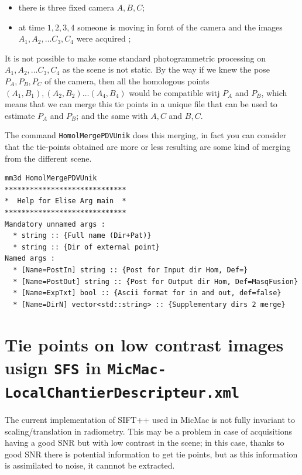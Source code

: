 \begin{itemize}
    \item there is three fixed camera $A,B,C$;
    \item at time $1,2,3,4$ someone is moving in fornt of the camera and the images $A_1,A_2, \dots C_3,C_4$ were acquired ;
\end{itemize}

It is not possible to make some standard photogrammetric processing on $A_1,A_2, \dots C_3,C_4$ as the scene is not static.
By the way if we knew the pose  $P_A,P_B,P_C$ of the camera, then  all the homologous points $(A_1,B_1), (A_2,B_2) \dots (A_4,B_4)$ 
would be compatible witj $P_A$ and $P_B$, which means that we can merge this tie points in a unique file that can be used
to estimate $P_A$ and $P_B$; and the same with $A,C$ and $B,C$. 


The command  {\tt HomolMergePDVUnik} does this merging, in fact you can consider that the tie-points 
obtained are more or less resulting are some kind of merging from the different scene. 

\begin{verbatim}
mm3d HomolMergePDVUnik
*****************************
*  Help for Elise Arg main  *
*****************************
Mandatory unnamed args : 
  * string :: {Full name (Dir+Pat)}
  * string :: {Dir of external point}
Named args : 
  * [Name=PostIn] string :: {Post for Input dir Hom, Def=}
  * [Name=PostOut] string :: {Post for Output dir Hom, Def=MasqFusion}
  * [Name=ExpTxt] bool :: {Ascii format for in and out, def=false}
  * [Name=DirN] vector<std::string> :: {Supplementary dirs 2 merge}
\end{verbatim}



\section{Tie points on low contrast images usign {\tt SFS} in {\tt MicMac-LocalChantierDescripteur.xml}}


The current implementation of SIFT++ used in MicMac is not fully invariant to scaling/translation in radiometry. This may be a problem in case of acquisitions having a good SNR but with low contrast in the scene; in this case, thanks to good SNR there is potential information to get tie points, but as this information is assimilated to noise, it cannnot be extracted.

